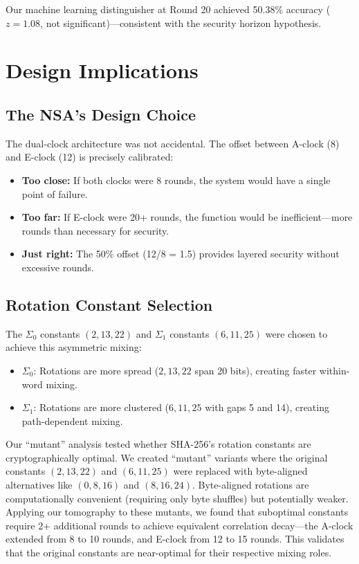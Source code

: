 \documentclass[11pt,a4paper]{article}
\theoremstyle{plain}
\theoremstyle{definition}
\theoremstyle{remark}
\begin{document}
Our machine learning distinguisher at Round 20 achieved 50.38\% accuracy ($z = 1.08$, not significant)---consistent with the security horizon hypothesis.

\section{Design Implications}

\subsection{The NSA's Design Choice}

The dual-clock architecture was not accidental. The offset between A-clock (8) and E-clock (12) is precisely calibrated:

\begin{itemize}
    \item \textbf{Too close:} If both clocks were 8 rounds, the system would have a single point of failure.
    \item \textbf{Too far:} If E-clock were 20+ rounds, the function would be inefficient---more rounds than necessary for security.
    \item \textbf{Just right:} The 50\% offset (12/8 = 1.5) provides layered security without excessive rounds.
\end{itemize}

\subsection{Rotation Constant Selection}

The $\Sigma_0$ constants $(2, 13, 22)$ and $\Sigma_1$ constants $(6, 11, 25)$ were chosen to achieve this asymmetric mixing:

\begin{itemize}
    \item $\Sigma_0$: Rotations are more spread ($2, 13, 22$ span 20 bits), creating faster within-word mixing.
    \item $\Sigma_1$: Rotations are more clustered ($6, 11, 25$ with gaps 5 and 14), creating path-dependent mixing.
\end{itemize}

Our ``mutant'' analysis tested whether SHA-256's rotation constants are cryptographically optimal. We created ``mutant'' variants where the original constants $(2, 13, 22)$ and $(6, 11, 25)$ were replaced with byte-aligned alternatives like $(0, 8, 16)$ and $(8, 16, 24)$. Byte-aligned rotations are computationally convenient (requiring only byte shuffles) but potentially weaker. Applying our tomography to these mutants, we found that suboptimal constants require 2+ additional rounds to achieve equivalent correlation decay---the A-clock extended from 8 to 10 rounds, and E-clock from 12 to 15 rounds. This validates that the original constants are near-optimal for their respective mixing roles.
\end{document}
